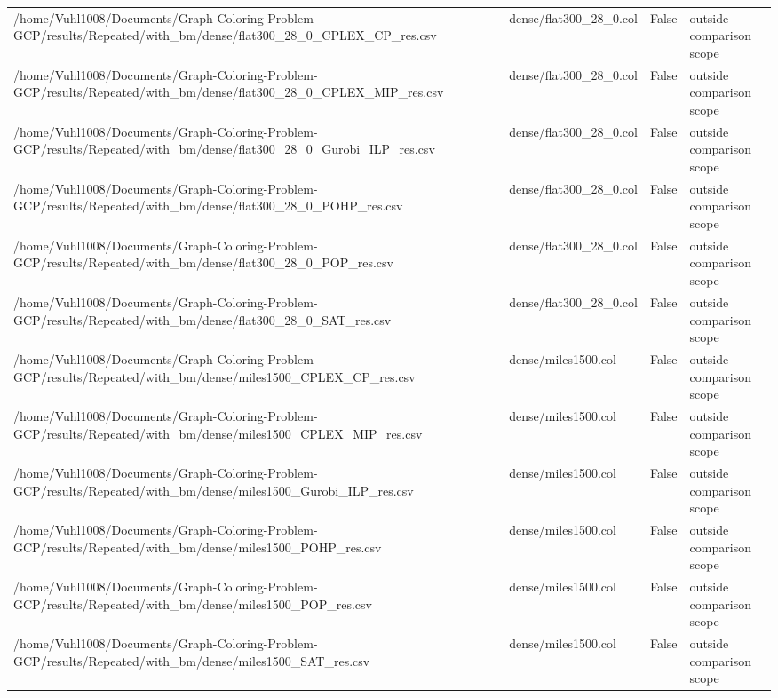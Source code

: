 \begin{table}[htbp]
\begin{tabular}{llll}
/home/Vuhl1008/Documents/Graph-Coloring-Problem-GCP/results/Repeated/with\_bm/dense/flat300\_28\_0\_CPLEX\_CP\_res.csv & dense/flat300\_28\_0.col & False & outside comparison scope \\
/home/Vuhl1008/Documents/Graph-Coloring-Problem-GCP/results/Repeated/with\_bm/dense/flat300\_28\_0\_CPLEX\_MIP\_res.csv & dense/flat300\_28\_0.col & False & outside comparison scope \\
/home/Vuhl1008/Documents/Graph-Coloring-Problem-GCP/results/Repeated/with\_bm/dense/flat300\_28\_0\_Gurobi\_ILP\_res.csv & dense/flat300\_28\_0.col & False & outside comparison scope \\
/home/Vuhl1008/Documents/Graph-Coloring-Problem-GCP/results/Repeated/with\_bm/dense/flat300\_28\_0\_POHP\_res.csv & dense/flat300\_28\_0.col & False & outside comparison scope \\
/home/Vuhl1008/Documents/Graph-Coloring-Problem-GCP/results/Repeated/with\_bm/dense/flat300\_28\_0\_POP\_res.csv & dense/flat300\_28\_0.col & False & outside comparison scope \\
/home/Vuhl1008/Documents/Graph-Coloring-Problem-GCP/results/Repeated/with\_bm/dense/flat300\_28\_0\_SAT\_res.csv & dense/flat300\_28\_0.col & False & outside comparison scope \\
/home/Vuhl1008/Documents/Graph-Coloring-Problem-GCP/results/Repeated/with\_bm/dense/miles1500\_CPLEX\_CP\_res.csv & dense/miles1500.col & False & outside comparison scope \\
/home/Vuhl1008/Documents/Graph-Coloring-Problem-GCP/results/Repeated/with\_bm/dense/miles1500\_CPLEX\_MIP\_res.csv & dense/miles1500.col & False & outside comparison scope \\
/home/Vuhl1008/Documents/Graph-Coloring-Problem-GCP/results/Repeated/with\_bm/dense/miles1500\_Gurobi\_ILP\_res.csv & dense/miles1500.col & False & outside comparison scope \\
/home/Vuhl1008/Documents/Graph-Coloring-Problem-GCP/results/Repeated/with\_bm/dense/miles1500\_POHP\_res.csv & dense/miles1500.col & False & outside comparison scope \\
/home/Vuhl1008/Documents/Graph-Coloring-Problem-GCP/results/Repeated/with\_bm/dense/miles1500\_POP\_res.csv & dense/miles1500.col & False & outside comparison scope \\
/home/Vuhl1008/Documents/Graph-Coloring-Problem-GCP/results/Repeated/with\_bm/dense/miles1500\_SAT\_res.csv & dense/miles1500.col & False & outside comparison scope \\

\end{tabular}
\end{table}
